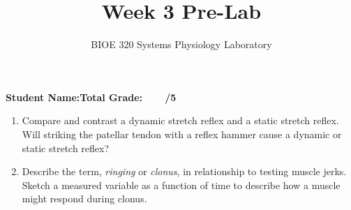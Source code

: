 \documentclass{article}
\title{Week 3 Pre-Lab}
\author{BIOE 320 Systems Physiology Laboratory}
\date{}
\begin{document}
\maketitle
\large

\textbf{Student Name:}\hfill 	\textbf{Total Grade:\ \ \ \ /5}\vspace{0.5cm}

\begin{enumerate}
	\item Compare and contrast a dynamic stretch reflex and a static stretch reflex. Will striking the patellar tendon with a reflex hammer cause a dynamic or static stretch reflex?
	\item Describe the term, \textit{ringing} or \textit{clonus}, in relationship to testing muscle jerks. Sketch a measured variable as a function of time to describe how a muscle might respond during clonus.
\end{enumerate}
\end{document}

